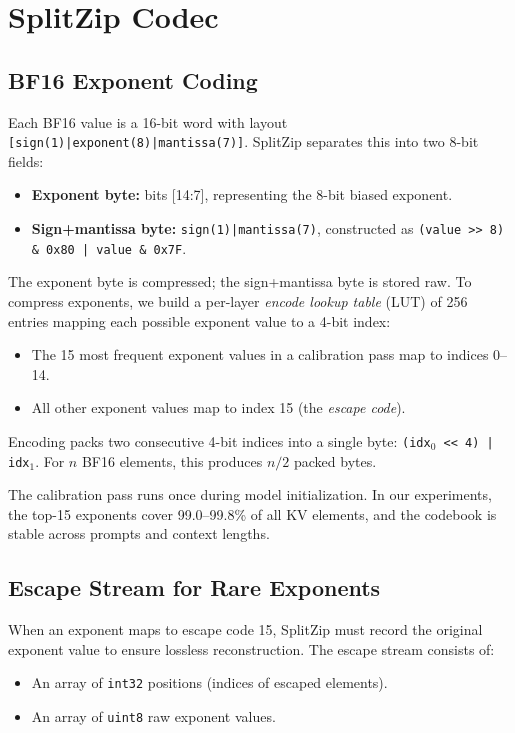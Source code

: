 \section{SplitZip Codec}
\label{sec:codec}

\subsection{BF16 Exponent Coding}

Each BF16 value is a 16-bit word with layout \texttt{[sign(1)|exponent(8)|mantissa(7)]}. SplitZip separates this into two 8-bit fields:
\begin{itemize}[nosep,leftmargin=*]
\item \textbf{Exponent byte:} bits [14:7], representing the 8-bit biased exponent.
\item \textbf{Sign+mantissa byte:} \texttt{sign(1)|mantissa(7)}, constructed as \texttt{(value >> 8) \& 0x80 | value \& 0x7F}.
\end{itemize}

The exponent byte is compressed; the sign+mantissa byte is stored raw. To compress exponents, we build a per-layer \emph{encode lookup table} (LUT) of 256 entries mapping each possible exponent value to a 4-bit index:
\begin{itemize}[nosep,leftmargin=*]
\item The 15 most frequent exponent values in a calibration pass map to indices 0--14.
\item All other exponent values map to index 15 (the \emph{escape code}).
\end{itemize}

Encoding packs two consecutive 4-bit indices into a single byte: \texttt{(idx$_0$ << 4) | idx$_1$}. For $n$ BF16 elements, this produces $n/2$ packed bytes.

The calibration pass runs once during model initialization. In our experiments, the top-15 exponents cover 99.0--99.8\% of all KV elements, and the codebook is stable across prompts and context lengths.

\subsection{Escape Stream for Rare Exponents}

When an exponent maps to escape code 15, SplitZip must record the original exponent value to ensure lossless reconstruction. The escape stream consists of:
\begin{itemize}[nosep,leftmargin=*]
\item An array of \texttt{int32} positions (indices of escaped elements).
\item An array of \texttt{uint8} raw exponent values.
\end{itemize}

